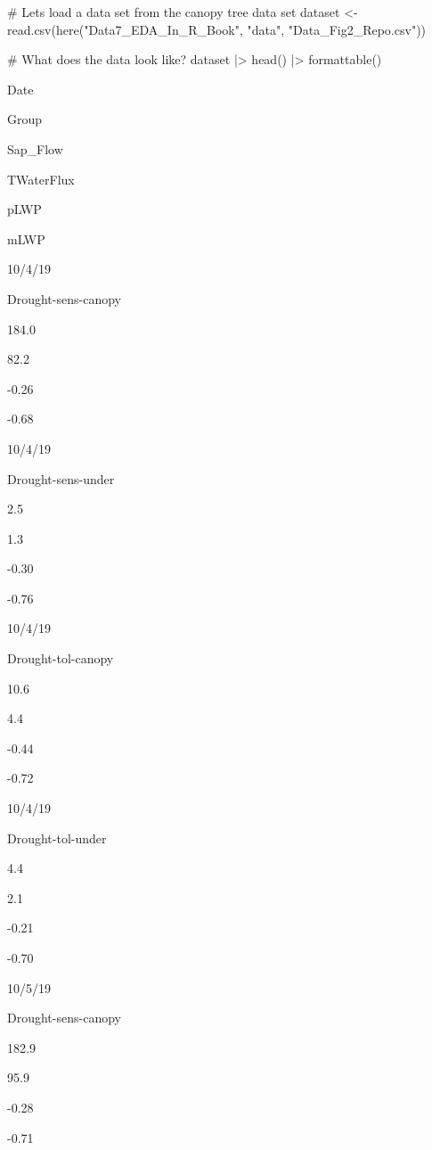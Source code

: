 \documentclass[
  letterpaper,
  DIV=11,
  numbers=noendperiod]{scrreprt}
\newenvironment{Shaded}{\begin{snugshade}}{\end{snugshade}}
\newcommand{\CommentTok}[1]{\textcolor[rgb]{0.37,0.37,0.37}{#1}}
\newcommand{\FunctionTok}[1]{\textcolor[rgb]{0.28,0.35,0.67}{#1}}
\newcommand{\NormalTok}[1]{\textcolor[rgb]{0.00,0.23,0.31}{#1}}
\newcommand{\OtherTok}[1]{\textcolor[rgb]{0.00,0.23,0.31}{#1}}
\newcommand{\SpecialCharTok}[1]{\textcolor[rgb]{0.37,0.37,0.37}{#1}}
\newcommand{\StringTok}[1]{\textcolor[rgb]{0.13,0.47,0.30}{#1}}
\begin{document}
\begin{Shaded}
\begin{Highlighting}[]
\CommentTok{\# Let\textquotesingle{}s load a data set from the canopy tree data set}
\NormalTok{dataset }\OtherTok{\textless{}{-}} \FunctionTok{read.csv}\NormalTok{(}\FunctionTok{here}\NormalTok{(}\StringTok{"Data7\_EDA\_In\_R\_Book"}\NormalTok{, }\StringTok{"data"}\NormalTok{, }\StringTok{"Data\_Fig2\_Repo.csv"}\NormalTok{)) }

\CommentTok{\# What does the data look like?}
\NormalTok{dataset }\SpecialCharTok{|\textgreater{}}
  \FunctionTok{head}\NormalTok{() }\SpecialCharTok{|\textgreater{}}
  \FunctionTok{formattable}\NormalTok{()}
\end{Highlighting}
\end{Shaded}

Date

Group

Sap\_Flow

TWaterFlux

pLWP

mLWP

10/4/19

Drought-sens-canopy

184.0

82.2

-0.26

-0.68

10/4/19

Drought-sens-under

2.5

1.3

-0.30

-0.76

10/4/19

Drought-tol-canopy

10.6

4.4

-0.44

-0.72

10/4/19

Drought-tol-under

4.4

2.1

-0.21

-0.70

10/5/19

Drought-sens-canopy

182.9

95.9

-0.28

-0.71
\end{document}
